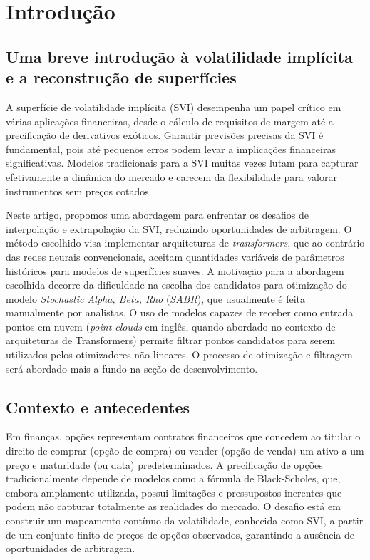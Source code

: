 \section{Introdução}
\subsection{Uma breve introdução à volatilidade implícita e a reconstrução de superfícies}
A superfície de volatilidade implícita (SVI) desempenha um papel crítico em várias aplicações financeiras, desde o cálculo de requisitos de margem até a precificação de derivativos exóticos. Garantir previsões precisas da SVI é fundamental, pois até pequenos erros podem levar a implicações financeiras significativas. Modelos tradicionais para a SVI muitas vezes lutam para capturar efetivamente a dinâmica do mercado e carecem da flexibilidade para valorar instrumentos sem preços cotados.

Neste artigo, propomos uma abordagem para enfrentar os desafios de interpolação e extrapolação da SVI, reduzindo oportunidades de arbitragem. O método escolhido visa implementar arquiteturas de \textit{transformers}, que ao contrário das redes neurais convencionais, aceitam quantidades variáveis de parâmetros históricos para modelos de superfícies suaves. A motivação para a abordagem escolhida decorre da dificuldade na escolha dos candidatos para otimização do modelo \textit{Stochastic Alpha, Beta, Rho} (\textit{SABR}), que usualmente é feita manualmente por analistas. O uso de modelos capazes de receber como entrada pontos em nuvem (\textit{point clouds} em inglês, quando abordado no contexto de arquiteturas de Transformers) permite filtrar pontos candidatos para serem utilizados pelos otimizadores não-lineares. O processo de otimização e filtragem será abordado mais a fundo na seção de desenvolvimento.

\subsection{Contexto e antecedentes}
Em finanças, opções representam contratos financeiros que concedem ao titular o direito de comprar (opção de compra) ou vender (opção de venda) um ativo a um preço e maturidade (ou data) predeterminados. A precificação de opções tradicionalmente depende de modelos como a fórmula de Black-Scholes, que, embora amplamente utilizada, possui limitações e pressupostos inerentes que podem não capturar totalmente as realidades do mercado. O desafio está em construir um mapeamento contínuo da volatilidade, conhecida como SVI, a partir de um conjunto finito de preços de opções observados, garantindo a ausência de oportunidades de arbitragem.

